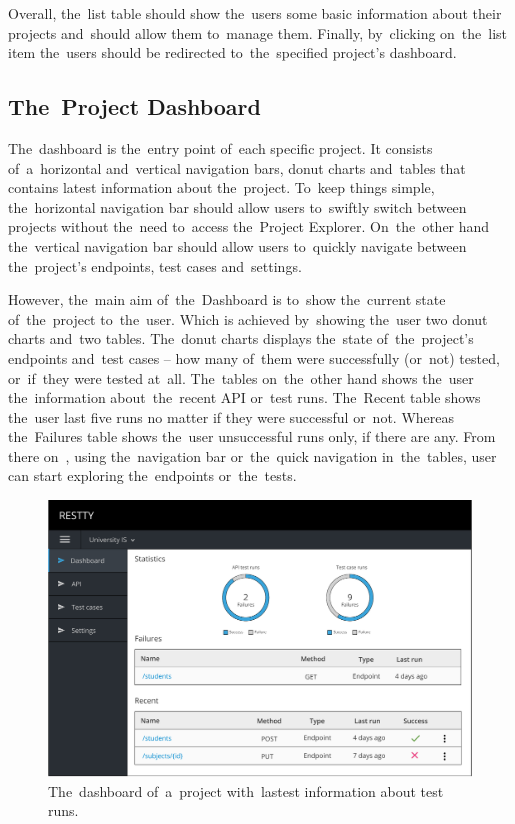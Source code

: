 Overall, the~list table should show the~users some basic information about their
projects and~should allow them to~manage them. Finally, by~clicking on~the~list
item the~users should be redirected to~the~specified project's dashboard.


\subsection{The~Project Dashboard}
The~dashboard is the~entry point of~each specific project. It consists
of~a~horizontal and~vertical navigation bars, donut charts and~tables that
contains latest information about the~project. To~keep things simple,
the~horizontal navigation bar should allow users to~swiftly switch between
projects without the~need to~access the~Project Explorer. On~the~other hand
the~vertical navigation bar should allow users to~quickly navigate between
the~project's endpoints, test cases and~settings.

However, the~main aim of~the~Dashboard is to~show the~current state
of~the~project to~the~user. Which is achieved by~showing the~user two donut
charts and~two tables. The~donut charts displays the~state of~the~project's
endpoints and~test cases -- how many of~them were successfully (or~not) tested,
or~if~they were tested at~all. The~tables on~the~other hand shows the~user
the~information about~the~recent API or~test runs. The~Recent table shows
the~user last five runs no matter if they were successful or~not. Whereas
the~Failures table shows the~user unsuccessful runs only, if there are any. From
there on~, using the~navigation bar or~the~quick navigation in~the~tables, user
can start exploring the~endpoints or~the~tests.

\begin{figure}[!hbt]
	\centering
	\includegraphics[scale=0.6]{./designs/dashboard.pdf}
	\caption{The~dashboard of~a~project with~lastest information about test runs.}
\end{figure}

